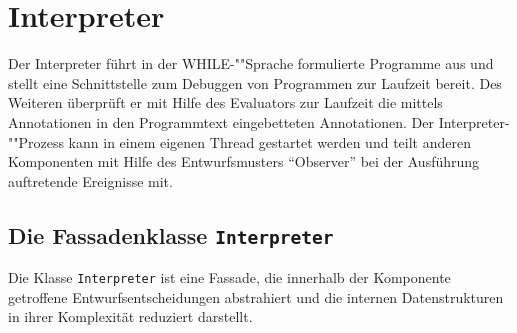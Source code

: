 \section{Interpreter}

Der Interpreter führt in der WHILE-""Sprache formulierte Programme aus und stellt eine Schnittstelle zum Debuggen von Programmen zur Laufzeit bereit. Des Weiteren überprüft er mit Hilfe des Evaluators zur Laufzeit die mittels Annotationen in den Programmtext eingebetteten Annotationen. Der Interpreter-""Prozess kann in einem eigenen Thread gestartet werden und teilt anderen Komponenten mit Hilfe des Entwurfsmusters ``Observer'' bei der Ausführung auftretende Ereignisse mit.

\subsection{Die Fassadenklasse \texttt{Interpreter}}
Die Klasse \texttt{Interpreter} ist eine Fassade, die innerhalb der Komponente getroffene Entwurfsentscheidungen abstrahiert und die internen Datenstrukturen in ihrer Komplexität reduziert darstellt.

